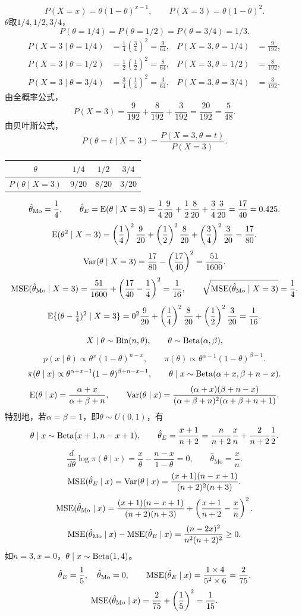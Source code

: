 \[
P(X=x)=\theta(1-\theta)^{x-1},\qquad
P(X=3)=\theta(1-\theta)^2.
\]
$\theta$取$1/4,1/2,3/4$，
\[
P(\theta=1/4)=P(\theta=1/2)=P(\theta=3/4)=1/3.
\]
\begin{align*}
P(X=3\mid\theta=1/4)&=\tfrac14(\tfrac34)^2=\tfrac9{64},
&P(X=3,\theta=1/4)&=\tfrac9{192},\\
P(X=3\mid\theta=1/2)&=\tfrac12(\tfrac12)^2=\tfrac8{64},
&P(X=3,\theta=1/2)&=\tfrac8{192},\\
P(X=3\mid\theta=3/4)&=\tfrac34(\tfrac14)^2=\tfrac3{64},
&P(X=3,\theta=3/4)&=\tfrac3{192}.
\end{align*}
由全概率公式，
\[
P(X=3)=\frac9{192}+\frac8{192}+\frac3{192}
=\frac{20}{192}=\frac5{48}.
\]
由贝叶斯公式，
\[
P(\theta=t\mid X=3)=\frac{P(X=3,\theta=t)}{P(X=3)}.
\]
\begin{center}
\begin{tabular}{c|ccc}
$\theta$&$1/4$&$1/2$&$3/4$\\\hline
$P(\theta\mid X=3)$&$9/20$&$8/20$&$3/20$
\end{tabular}
\end{center}
\[
\hat\theta_{\mathrm{Mo}}=\frac14,\qquad
\hat\theta_E=\operatorname{E}(\theta\mid X=3)
=\frac14\frac9{20}+\frac12\frac8{20}+\frac34\frac3{20}
=\frac{17}{40}=0.425.
\]
\[
\operatorname{E}(\theta^2\mid X=3)
=\left(\frac14\right)^2\frac9{20}
+\left(\frac12\right)^2\frac8{20}
+\left(\frac34\right)^2\frac3{20}=\frac{17}{80}.
\]
\[
\operatorname{Var}(\theta\mid X=3)=\frac{17}{80}-\left(\frac{17}{40}\right)^2
=\frac{51}{1600}.
\]
\[
\operatorname{MSE}(\hat\theta_{\mathrm{Mo}}\mid X=3)
=\frac{51}{1600}+\left(\frac{17}{40}-\frac14\right)^2
=\frac1{16},\qquad
\sqrt{\operatorname{MSE}(\hat\theta_{\mathrm{Mo}}\mid X=3)}=\frac14.
\]
\[
\operatorname{E}\{(\theta-\tfrac14)^2\mid X=3\}
=0^2\frac9{20}+\left(\frac14\right)^2\frac8{20}
+\left(\frac12\right)^2\frac3{20}=\frac1{16}.
\]

\[
X\mid\theta\sim\operatorname{Bin}(n,\theta),\qquad\theta\sim\operatorname{Beta}(\alpha,\beta),
\]
\[
p(x\mid\theta)\propto\theta^x(1-\theta)^{n-x},\qquad
\pi(\theta)\propto\theta^{\alpha-1}(1-\theta)^{\beta-1}.
\]
\[
\pi(\theta\mid x)\propto\theta^{\alpha+x-1}(1-\theta)^{\beta+n-x-1},
\qquad\theta\mid x\sim\operatorname{Beta}(\alpha+x,\beta+n-x).
\]
\[
\operatorname{E}(\theta\mid x)=\frac{\alpha+x}{\alpha+\beta+n},\qquad
\operatorname{Var}(\theta\mid x)=
\frac{(\alpha+x)(\beta+n-x)}
{(\alpha+\beta+n)^2(\alpha+\beta+n+1)}.
\]
特别地，若$\alpha=\beta=1$，即$\theta\sim U(0,1)$，有
\[
\theta\mid x\sim\operatorname{Beta}(x+1,n-x+1),\qquad
\hat\theta_E=\frac{x+1}{n+2}
=\frac n{n+2}\frac xn+\frac2{n+2}\frac12.
\]
\[
\frac d{d\theta}\log\pi(\theta\mid x)
=\frac x\theta-\frac{n-x}{1-\theta}=0,\qquad
\hat\theta_{\mathrm{Mo}}=\frac xn.
\]
\[
\operatorname{MSE}(\hat\theta_E\mid x)=\operatorname{Var}(\theta\mid x)
=\frac{(x+1)(n-x+1)}{(n+2)^2(n+3)}.
\]
\[
\operatorname{MSE}(\hat\theta_{\mathrm{Mo}}\mid x)
=\frac{(x+1)(n-x+1)}{(n+2)(n+3)}
+\left(\frac{x+1}{n+2}-\frac xn\right)^2.
\]
\[
\operatorname{MSE}(\hat\theta_{\mathrm{Mo}}\mid x)-\operatorname{MSE}(\hat\theta_E\mid x)
=\frac{(n-2x)^2}{n^2(n+2)^2}\geq0.
\]
如$n=3,x=0$，$\theta\mid x\sim\operatorname{Beta}(1,4)$。
\[
\hat\theta_E=\frac15,\quad\hat\theta_{\mathrm{Mo}}=0,\qquad
\operatorname{MSE}(\hat\theta_E\mid x)=\frac{1\times4}{5^2\times6}=\frac2{75},
\]
\[
\operatorname{MSE}(\hat\theta_{\mathrm{Mo}}\mid x)
=\frac2{75}+\left(\frac15\right)^2=\frac1{15}.
\]
